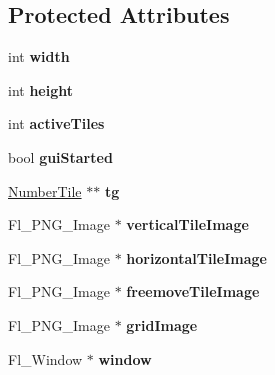 \subsection*{Protected Attributes}
\begin{DoxyCompactItemize}
\item 
\mbox{\label{classTileGrid_af2ee61ae41650ffb93fc4b6975e3143a}} 
int {\bfseries width}
\item 
\mbox{\label{classTileGrid_a4cd5d4b76ead1a32439d01c256bbd9bb}} 
int {\bfseries height}
\item 
\mbox{\label{classTileGrid_a1afb95636a0becac452f9462640b1cb0}} 
int {\bfseries active\+Tiles}
\item 
\mbox{\label{classTileGrid_a54b6e7b72eb56b767d785f2569d61e25}} 
bool {\bfseries gui\+Started}
\item 
\mbox{\label{classTileGrid_a9510cd976917a1b2de3f77e6e5438c38}} 
\hyperlink{classNumberTile}{Number\+Tile} $\ast$$\ast$ {\bfseries tg}
\item 
\mbox{\label{classTileGrid_afe896c32e37e451e29404de577241af9}} 
Fl\+\_\+\+P\+N\+G\+\_\+\+Image $\ast$ {\bfseries vertical\+Tile\+Image}
\item 
\mbox{\label{classTileGrid_ab79e54ec1fe7b95b190fe9d01be70835}} 
Fl\+\_\+\+P\+N\+G\+\_\+\+Image $\ast$ {\bfseries horizontal\+Tile\+Image}
\item 
\mbox{\label{classTileGrid_a7d96403e75a06c2a71762e3db7a1140d}} 
Fl\+\_\+\+P\+N\+G\+\_\+\+Image $\ast$ {\bfseries freemove\+Tile\+Image}
\item 
\mbox{\label{classTileGrid_a16d95a658fc80ae8df57857c0fef3650}} 
Fl\+\_\+\+P\+N\+G\+\_\+\+Image $\ast$ {\bfseries grid\+Image}
\item 
\mbox{\label{classTileGrid_a8cc869dec35105d7f9364dd7e409b5cd}} 
Fl\+\_\+\+Window $\ast$ {\bfseries window}
\item 
\mbox{\label{classTileGrid_a96fc578c503bd377b75c146dc4d7e91d}} 
$$
\end{DoxyCompactItemize}
